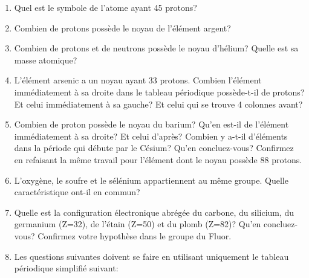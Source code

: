 \begin{enumerate}[\bf 1)]
\item Quel est le symbole de l'atome ayant 45 protons?
\item Combien de protons poss\`ede le noyau de l'\'el\'ement argent?
\item Combien de protons et de neutrons poss\`ede le noyau d'h\'elium? Quelle est sa masse atomique?
\item L'\'el\'ement arsenic a un noyau ayant 33 protons. Combien l'\'el\'ement imm\'ediatement \`a sa droite dans le tableau
p\'eriodique poss\`ede-t-il de protons? Et celui imm\'ediatement \`a sa gauche? Et celui qui se trouve
4 colonnes avant?
\item Combien de proton poss\`ede le noyau du barium? Qu'en est-il de l'\'el\'ement imm\'ediatement \`a sa droite? Et celui d'apr\`es?
Combien y a-t-il d'\'el\'ements dans la p\'eriode qui d\'ebute par le C\'esium? Qu'en concluez-vous? Confirmez en refaisant la m\^eme travail pour
l'\'el\'ement dont le noyau poss\`ede 88 protons.
\item L'oxyg\`ene, le soufre et le s\'el\'enium appartiennent au m\^eme groupe.
Quelle caract\'eristique ont-il en commun?
\item Quelle est la configuration \'electronique abrégée du carbone, du silicium, du germanium (Z=32),
de l'\'etain (Z=50) et du plomb (Z=82)?
Qu'en concluez-vous? Confirmez votre hypoth\`ese dans le groupe du Fluor.
\item Les questions suivantes doivent se faire en utilisant uniquement le tableau p\'eriodique
simplifié suivant:

\newcommand{\elt}[2]{\raisebox{0pt}[10mm][5mm]{%
                           \raisebox{5mm}{\small {\fontfamily{phv}\selectfont }}{\large \bf {\fontfamily{phv}\selectfont #2}}}%
                    }
\newlength{\currX}\setlength{\currX}{1cm}
\newlength{\currY}\setlength{\currY}{1cm}
\newlength{\nextX}\setlength{\nextX}{0cm}
\newlength{\nextY}\setlength{\nextY}{0cm}
\newlength{\pseltW}\setlength{\pseltW}{2cm}
\newlength{\pseltH}\setlength{\pseltH}{2cm}
\newcommand{\pselt}[1]{%
\setlength{\nextX}{\currX} \addtolength{\nextX}{\pseltW}
\setlength{\nextY}{\currY} \addtolength{\nextY}{\pseltH}
\psframe[border=0pt,fillstyle=solid,fillcolor=red](\currX,\currY)(\nextX,\nextY)
\setlength{\currX}{\nextX}
}


\end{enumerate}
